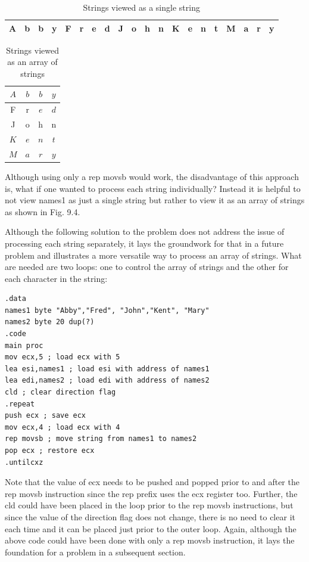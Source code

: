 \documentclass[10pt]{book}
\begin{document}
\begin{table}[ht]
\centering
\begin{tabular}{|l|l|l|l|l|l|l|l|l|l|l|l|l|l|l|l|l|l|l|l|}
\hline
A & b & b & y & F & r & e & d & J & o & h & n & K & e & n & t & M & a & r & y \\
\hline
\end{tabular}
\caption{Strings viewed as a single string}
\end{table}
\begin{table}[ht]
\centering
\begin{tabular}{|c|c|c|c|}
\hline
$A$ & $b$ & $b$ & $y$ \\
\hline
F & r & $e$ & $d$ \\
\hline
J & o & h & n \\
\hline
$K$ & $e$ & $n$ & $t$ \\
\hline
$M$ & $a$ & $r$ & $y$ \\
\hline
\end{tabular}
\caption{Strings viewed as an array of strings}
\end{table}

Although using only a rep movsb would work, the disadvantage of this approach is, what if one wanted to process each string individually? Instead it is helpful to not view names1 as just a single string but rather to view it as an array of strings as shown in Fig. 9.4.

Although the following solution to the problem does not address the issue of processing each string separately, it lays the groundwork for that in a future problem and illustrates a more versatile way to process an array of strings. What are needed are two loops: one to control the array of strings and the other for each character in the string:

\begin{verbatim}
.data
names1 byte "Abby","Fred", "John","Kent", "Mary"
names2 byte 20 dup(?)
.code
main proc
mov ecx,5 ; load ecx with 5
lea esi,names1 ; load esi with address of names1
lea edi,names2 ; load edi with address of names2
cld ; clear direction flag
.repeat
push ecx ; save ecx
mov ecx,4 ; load ecx with 4
rep movsb ; move string from names1 to names2
pop ecx ; restore ecx
.untilcxz
\end{verbatim}

Note that the value of ecx needs to be pushed and popped prior to and after the rep movsb instruction since the rep prefix uses the ecx register too. Further, the cld could have been placed in the loop prior to the rep movsb instructions, but since the value of the direction flag does not change, there is no need to clear it each time and it can be placed just prior to the outer loop. Again, although the above code could have been done with only a rep movsb instruction, it lays the foundation for a problem in a subsequent section.
\end{document}
